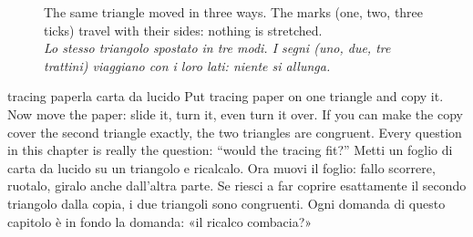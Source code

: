 \documentclass[10pt,a4paper,oneside]{book}
\newcommand{\bicap}[2]{\caption{#1\\{\color{itgreen}\itshape #2}}}
\begin{document}
\begin{figure}[htbp]
\centering
\bicap{The same triangle moved in three ways. The marks (one, two, three ticks) travel with their sides: nothing is stretched.}%
      {Lo stesso triangolo spostato in tre modi. I segni (uno, due, tre trattini) viaggiano con i loro lati: niente si allunga.}
\label{fig:moves}
\end{figure}

\begin{anchor}{tracing paper}{la carta da lucido}
Put tracing paper on one triangle and copy it. Now move the paper: slide it, turn it, even turn it over. If you can make the copy cover the second triangle exactly, the two triangles are congruent. Every question in this chapter is really the question: ``would the tracing fit?''
\tcblower
Metti un foglio di carta da lucido su un triangolo e ricalcalo. Ora muovi il foglio: fallo scorrere, ruotalo, giralo anche dall'altra parte. Se riesci a far coprire esattamente il secondo triangolo dalla copia, i due triangoli sono congruenti. Ogni domanda di questo capitolo è in fondo la domanda: «il ricalco combacia?»
\end{anchor}
\end{document}
